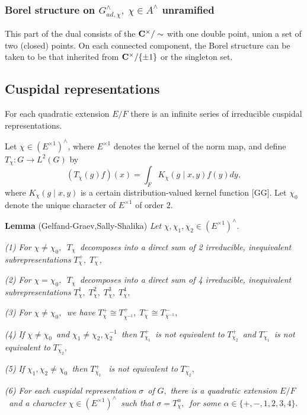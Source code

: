 \subsubsection{Borel structure on $G_{ad,\chi }^{\wedge },\;\chi \in
A^{\wedge }$ unramified}

This part of the dual consists of the ${\bf C}^{\times }/\sim$ with
one double point, union a set of two (closed) points. On each connected
component, the Borel structure can be taken to be that inherited from
${\bf C}^{\times }/\{\pm 1\}$ or the singleton set.

\subsection{Cuspidal representations}

For each quadratic extension $E/F$ there is an infinite series of
irreducible cuspidal representations.

Let $\chi \in (E^{\times 1})^{\wedge }$, where $E^{\times 1}$ denotes the
kernel of the norm map, and define $T_\chi :G\rightarrow L^2(G)$ by 
\[
(T_\chi (g)f)(x)=\int_FK_\chi (g\;|\;x,y)f(y)dy, 
\]
where $K_\chi (g\;|\;x,y)$ is a certain distribution-valued kernel function
[GG]. Let $\chi _0$ denote the unique character of $E^{\times 1}$ of order $%
2 $.

{\bf Lemma} (Gelfand-Graev,Sally-Shalika) {\em Let }$\chi ,\chi _1,\chi
_2\in (E^{\times 1})^{\wedge }.$

{\em (1) For }$\chi \neq \chi _0,${\em \ }$T_\chi ${\em \ decomposes into a
direct sum of 2 irreducible, inequivalent subrepresentations }$T_\chi
^{+},\;T_\chi ^{-},$

{\em (2) For }$\chi =\chi _0,${\em \ }$T_\chi ${\em \ decomposes into a
direct sum of 4 irreducible, inequivalent subrepresentations }$T_\chi
^1,\;T_\chi ^2,\;T_\chi ^3,\;T_\chi ^4,$

{\em (3) For }$\chi \neq \chi _0,${\em \ we have }$T_\chi ^{+}\cong T_{\chi
^{-1}}^{+},\;T_\chi ^{-}\cong T_{\chi ^{-1}}^{-},$

{\em (4) If }$\chi \neq \chi _0${\em \ and }$\chi _1\neq \chi _2,\chi
_2^{-1} ${\em \ then }$T_{\chi _1}^{+}${\em \ is not equivalent to }$T_{\chi
_2}^{+}${\em \ and }$T_{\chi _1}^{-}${\em \ is not equivalent to }$T_{\chi
_2}^{-},$

{\em (5) If }$\chi _1,\chi _2\neq \chi _0${\em \ then }$T_{\chi _1}^{+}${\em %
\ is not equivalent to }$T_{\chi _2}^{-},$

{\em (6) For each cuspidal representation }$\sigma ${\em \ of }$G,${\em %
there is a quadratic extension }$E/F${\em \ and a character }$\chi \in
(E^{\times 1})^{\wedge }${\em \ such that }$\sigma =T_\chi ^\alpha ,${\em \
for some }$\alpha \in \{+,-,1,2,3,4\}.$

